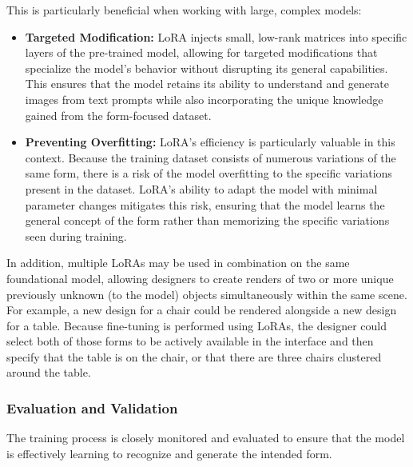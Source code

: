 \documentclass[12pt]{report}
\begin{document}
This is particularly beneficial when working with large, complex models:

\begin{itemize}
    \item \textbf{Targeted Modification:} LoRA injects small, low-rank matrices into specific layers of the pre-trained model, allowing for targeted modifications that specialize the model's behavior without disrupting its general capabilities. This ensures that the model retains its ability to understand and generate images from text prompts while also incorporating the unique knowledge gained from the form-focused dataset.
    \item \textbf{Preventing Overfitting:} LoRA's efficiency is particularly valuable in this context. Because the training dataset consists of numerous variations of the same form, there is a risk of the model overfitting to the specific variations present in the dataset. LoRA's ability to adapt the model with minimal parameter changes mitigates this risk, ensuring that the model learns the general concept of the form rather than memorizing the specific variations seen during training.
\end{itemize}

In addition, multiple LoRAs may be used in combination on the same foundational model, allowing designers to create renders of two or more unique previously unknown (to the model) objects simultaneously within the same scene. For example, a new design for a chair could be rendered alongside a new design for a table. Because fine-tuning is performed using LoRAs, the designer could select both of those forms to be actively available in the interface and then specify that the table is on the chair, or that there are three chairs clustered around the table. 

\subsubsection{Evaluation and Validation}
The training process is closely monitored and evaluated to ensure that the model is effectively learning to recognize and generate the intended form.
\end{document}
